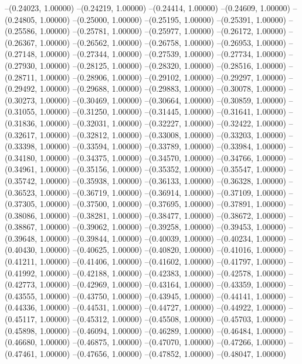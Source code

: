 --(0.24023, 1.00000)
--(0.24219, 1.00000)
--(0.24414, 1.00000)
--(0.24609, 1.00000)
--(0.24805, 1.00000)
--(0.25000, 1.00000)
--(0.25195, 1.00000)
--(0.25391, 1.00000)
--(0.25586, 1.00000)
--(0.25781, 1.00000)
--(0.25977, 1.00000)
--(0.26172, 1.00000)
--(0.26367, 1.00000)
--(0.26562, 1.00000)
--(0.26758, 1.00000)
--(0.26953, 1.00000)
--(0.27148, 1.00000)
--(0.27344, 1.00000)
--(0.27539, 1.00000)
--(0.27734, 1.00000)
--(0.27930, 1.00000)
--(0.28125, 1.00000)
--(0.28320, 1.00000)
--(0.28516, 1.00000)
--(0.28711, 1.00000)
--(0.28906, 1.00000)
--(0.29102, 1.00000)
--(0.29297, 1.00000)
--(0.29492, 1.00000)
--(0.29688, 1.00000)
--(0.29883, 1.00000)
--(0.30078, 1.00000)
--(0.30273, 1.00000)
--(0.30469, 1.00000)
--(0.30664, 1.00000)
--(0.30859, 1.00000)
--(0.31055, 1.00000)
--(0.31250, 1.00000)
--(0.31445, 1.00000)
--(0.31641, 1.00000)
--(0.31836, 1.00000)
--(0.32031, 1.00000)
--(0.32227, 1.00000)
--(0.32422, 1.00000)
--(0.32617, 1.00000)
--(0.32812, 1.00000)
--(0.33008, 1.00000)
--(0.33203, 1.00000)
--(0.33398, 1.00000)
--(0.33594, 1.00000)
--(0.33789, 1.00000)
--(0.33984, 1.00000)
--(0.34180, 1.00000)
--(0.34375, 1.00000)
--(0.34570, 1.00000)
--(0.34766, 1.00000)
--(0.34961, 1.00000)
--(0.35156, 1.00000)
--(0.35352, 1.00000)
--(0.35547, 1.00000)
--(0.35742, 1.00000)
--(0.35938, 1.00000)
--(0.36133, 1.00000)
--(0.36328, 1.00000)
--(0.36523, 1.00000)
--(0.36719, 1.00000)
--(0.36914, 1.00000)
--(0.37109, 1.00000)
--(0.37305, 1.00000)
--(0.37500, 1.00000)
--(0.37695, 1.00000)
--(0.37891, 1.00000)
--(0.38086, 1.00000)
--(0.38281, 1.00000)
--(0.38477, 1.00000)
--(0.38672, 1.00000)
--(0.38867, 1.00000)
--(0.39062, 1.00000)
--(0.39258, 1.00000)
--(0.39453, 1.00000)
--(0.39648, 1.00000)
--(0.39844, 1.00000)
--(0.40039, 1.00000)
--(0.40234, 1.00000)
--(0.40430, 1.00000)
--(0.40625, 1.00000)
--(0.40820, 1.00000)
--(0.41016, 1.00000)
--(0.41211, 1.00000)
--(0.41406, 1.00000)
--(0.41602, 1.00000)
--(0.41797, 1.00000)
--(0.41992, 1.00000)
--(0.42188, 1.00000)
--(0.42383, 1.00000)
--(0.42578, 1.00000)
--(0.42773, 1.00000)
--(0.42969, 1.00000)
--(0.43164, 1.00000)
--(0.43359, 1.00000)
--(0.43555, 1.00000)
--(0.43750, 1.00000)
--(0.43945, 1.00000)
--(0.44141, 1.00000)
--(0.44336, 1.00000)
--(0.44531, 1.00000)
--(0.44727, 1.00000)
--(0.44922, 1.00000)
--(0.45117, 1.00000)
--(0.45312, 1.00000)
--(0.45508, 1.00000)
--(0.45703, 1.00000)
--(0.45898, 1.00000)
--(0.46094, 1.00000)
--(0.46289, 1.00000)
--(0.46484, 1.00000)
--(0.46680, 1.00000)
--(0.46875, 1.00000)
--(0.47070, 1.00000)
--(0.47266, 1.00000)
--(0.47461, 1.00000)
--(0.47656, 1.00000)
--(0.47852, 1.00000)
--(0.48047, 1.00000)
